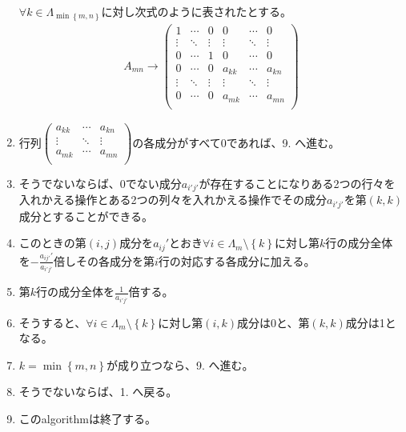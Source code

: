 \documentclass[dvipdfmx]{jsarticle}
\begin{document}
\begin{thm}
\begin{enumerate}
  $\forall k \in \varLambda_{\min\left\{ m,n \right\}}$に対し次式のように表されたとする。
\begin{align*}
A_{mn} \rightarrow \begin{pmatrix}
1 & \cdots & 0 & 0 & \cdots & 0 \\
 \vdots & \ddots & \vdots & \vdots & \ddots & \vdots \\
0 & \cdots & 1 & 0 & \cdots & 0 \\
0 & \cdots & 0 & a_{kk} & \cdots & a_{kn} \\
 \vdots & \ddots & \vdots & \vdots & \ddots & \vdots \\
0 & \cdots & 0 & a_{mk} & \cdots & a_{mn} \\
\end{pmatrix}
\end{align*}
\item
  行列$\begin{pmatrix}
  a_{kk} & \cdots & a_{kn} \\
   \vdots & \ddots & \vdots \\
  a_{mk} & \cdots & a_{mn} \\
  \end{pmatrix}$の各成分がすべて0であれば、9. へ進む。
\item
  そうでないならば、0でない成分$a_{i'j'}$が存在することになりある2つの行々を入れかえる操作とある2つの列々を入れかえる操作でその成分$a_{i'j'}$を第$(k,k)$成分とすることができる。
\item
  このときの第$(i,j)$成分を$a_{ij}'$とおき$\forall i \in \varLambda_{m} \setminus \left\{ k \right\} に対し第k$行の成分全体を$- \frac{a_{ij'}'}{a_{i'j'}}$倍しその各成分を第$i$行の対応する各成分に加える。
\item
  第$k$行の成分全体を$\frac{1}{a_{i'j'}}$倍する。
\item
  そうすると、$\forall i \in \varLambda_{m} \setminus \left\{ k \right\} に対し第(i,k)$成分は0と、第$(k,k)$成分は1となる。
\item
  $k = \min\left\{ m,n \right\}$が成り立つなら、9. へ進む。
\item
  そうでないならば、1. へ戻る。
\item
  このalgorithmは終了する。
\end{enumerate}
\end{thm}
\end{document}
